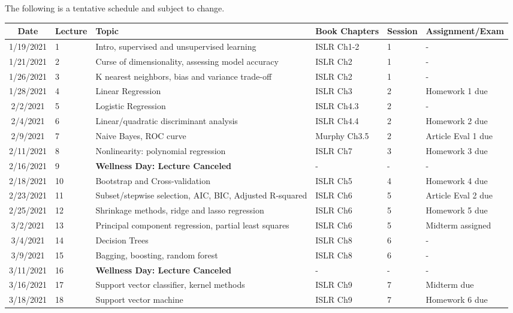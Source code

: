 \documentclass[11pt]{article}
\begin{document}
The following is a tentative schedule and subject to change.
\begin{center}
\begin{tabular}{c|m{3em}|m{21em}|m{7em}|m{3em}|m{8em}}
Date & Lecture & Topic & Book Chapters & Session & Assignment/Exam\\
\hline
1/19/2021 & 1 & Intro, supervised and unsupervised learning & ISLR Ch1-2 &  1 & - \\ \hline
1/21/2021 & 2 & Curse of dimensionality, assessing model accuracy & ISLR Ch2 &  1 & - \\ \hline
1/26/2021 & 3 & K nearest neighbors, bias and variance trade-off  & ISLR Ch2 &  1 & - \\ \hline
1/28/2021 & 4 & Linear Regression & ISLR Ch3 &  2 & Homework 1 due \\ \hline
2/2/2021 & 5 & Logistic Regression & ISLR Ch4.3 &  2 & - \\ \hline
2/4/2021 & 6 & Linear/quadratic discriminant analysis & ISLR Ch4.4 &  2 & Homework 2 due \\ \hline
2/9/2021 & 7 & Naive Bayes, ROC curve & Murphy Ch3.5 &  2 & Article Eval 1 due \\ \hline
2/11/2021 & 8 & Nonlinearity: polynomial regression & ISLR Ch7 & 3 & Homework 3 due \\ \hline
2/16/2021 & 9 & \textbf{Wellness Day: Lecture Canceled} & - & - & -\\ \hline
2/18/2021 & 10 & Bootstrap and Cross-validation & ISLR Ch5 &  4 & Homework 4 due \\ \hline
2/23/2021 & 11 &  Subset/stepwise selection, AIC, BIC, Adjusted R-squared & ISLR Ch6 &  5 & Article Eval 2 due \\ \hline
2/25/2021 & 12 & Shrinkage methods, ridge and lasso regression & ISLR Ch6 & 5 & Homework 5 due \\ \hline
3/2/2021 & 13 & Principal component regression, partial least squares & ISLR Ch6 & 5 & Midterm assigned\\ \hline
3/4/2021 & 14 & Decision Trees & ISLR Ch8 & 6 & - \\ \hline
3/9/2021 & 15 & Bagging, boosting, random forest & ISLR Ch8 & 6 & - \\ \hline
3/11/2021 & 16 & \textbf{Wellness Day: Lecture Canceled} & - & - & - \\ \hline
3/16/2021 & 17 & Support vector classifier, kernel methods & ISLR Ch9 & 7 & Midterm due \\ \hline
3/18/2021 & 18 & Support vector machine & ISLR Ch9 &  7 & Homework 6 due\\ \hline

\end{tabular}
\end{center}
\end{document}
